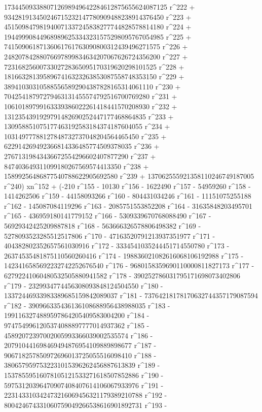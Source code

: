        1734450933880712698949642284612875655624087125 r^222 + 
       934281913450246715232147780909488238914376450 r^223 + 
       451509847981940071337245838277744828578814180 r^224 + 
       194499908449689896253343231575298095767054985 r^225 + 
       74150906187136061761763090800312439496271575 r^226 + 
       24820784288076697899834634207067626724356200 r^227 + 
       7231682560073302728365095170319620298101525 r^228 + 
       1816632813958967416323263853087558748353150 r^229 + 
       389410303105885565892904387828165314061110 r^230 + 
       70425418797279463131455574792516700769280 r^231 + 
       10610189799163339386022261418441570208930 r^232 + 
       1312354391929791482690252447177468864835 r^233 + 
       130958851075177463192583184374187604055 r^234 + 
       10314977788127848732737048204564465450 r^235 + 
       622914269492366814336485774509378035 r^236 + 
       27671319843436672554296602407877290 r^237 + 
       847403649311099180267569574413350 r^238 + 
       15899256486877540788622905692580 r^239 + 
       137062555921358110246749187005 r^240) xn^152 + (-210 r^155 - 
       10130 r^156 - 1622490 r^157 - 54959260 r^158 - 
       1414262506 r^159 - 44158093266 r^160 - 804431034246 r^161 - 
       11151075255188 r^162 - 145087084119296 r^163 - 
       2085751553852208 r^164 - 31635848203495701 r^165 - 
       436959180141779152 r^166 - 5309339670768088490 r^167 - 
       56929342425209887818 r^168 - 563666326578806498382 r^169 - 
       5278093523285512517806 r^170 - 47163520791213937351977 r^171 - 
       404382802352657561030916 r^172 - 
       3334541035244451714550780 r^173 - 
       26374535481875110560260416 r^174 - 
       198836021082616068106192988 r^175 - 
       1423416585692232742252676540 r^176 - 
       9680158359690110000811827173 r^177 - 
       62792241060480532505880941582 r^178 - 
       390252786031795171698073402806 r^179 - 
       2329934774456308093848124504550 r^180 - 
       13372446933983389685159842089037 r^181 - 
       73764218178170632744357179087594 r^182 - 
       390966335436136108688956438988035 r^183 - 
       1991163274889597864205409583004200 r^184 - 
       9747549961205374088897777014937362 r^185 - 
       45892072397002005993366039002535574 r^186 - 
       207910441698469494876954109889898677 r^187 - 
       906718257850972696013725055516098410 r^188 - 
       3806579597532231015396262456887613839 r^189 - 
       15378559516078105121533271618507852886 r^190 - 
       59753120396470907408407614106067933976 r^191 - 
       223143310342473216069456321179389210788 r^192 - 
       800424674331060759049266538616901892731 r^193 - 
